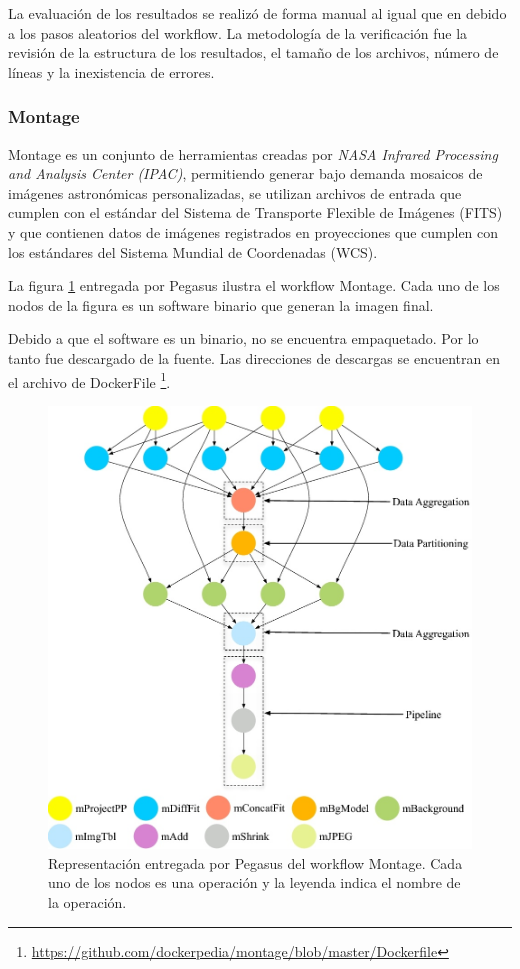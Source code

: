 La evaluación de los resultados se realizó de forma manual al igual que en \cite{santana2017reproducibility} debido a los pasos aleatorios del workflow. La metodología de la verificación fue la revisión de la estructura de los resultados, el tamaño de los archivos, número de líneas y la inexistencia de errores.

\subsubsection{Montage}

Montage es un conjunto de herramientas creadas por \textit{NASA Infrared Processing and Analysis Center (IPAC)}, permitiendo generar bajo demanda mosaicos de imágenes astronómicas personalizadas, se utilizan archivos de entrada que cumplen con el estándar del Sistema de Transporte Flexible de Imágenes (FITS) y que contienen datos de imágenes registrados en proyecciones que cumplen con los estándares del Sistema Mundial de Coordenadas (WCS).

La figura \ref{fig:montage} entregada por Pegasus ilustra el workflow Montage. Cada uno de los nodos de la figura es un software binario que generan la imagen final.

Debido a que el software es un binario, no se encuentra empaquetado. Por lo tanto fue descargado de la fuente. Las direcciones de descargas se encuentran en el archivo de DockerFile \footnote{\url{https://github.com/dockerpedia/montage/blob/master/Dockerfile}}.  

\begin{figure}[t]
\centering
\includegraphics[width=.5\textwidth]{Figures/montage}
\caption[Representación workflow: Montage]{Representación entregada por Pegasus del workflow Montage. Cada uno de los nodos es una operación y la leyenda indica el nombre de la operación.}\label{fig:montage}
\end{figure}

